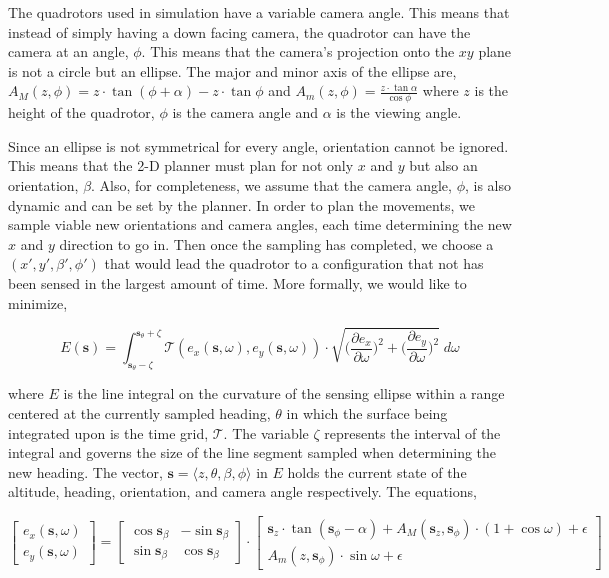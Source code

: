 \documentclass[12pt]{article}
\newcommand{\s}{\textbf{s}}
\begin{document}
The quadrotors used in simulation have a variable camera angle. This means that
instead of simply having a down facing camera, the quadrotor can have the
camera at an angle, $\phi$. This means that the camera's projection onto the
$xy$ plane is not a circle but an ellipse. The major and minor axis of the
ellipse are, $ A_M(z, \phi) = z \cdot \tan{(\phi + \alpha)} - z \cdot
\tan{\phi} $ and $ A_m(z, \phi) = \frac{z \cdot \tan{\alpha}}{\cos{\phi}} $
where $z$ is the height of the quadrotor, $\phi$ is the camera angle and
$\alpha$ is the viewing angle.

Since an ellipse is not symmetrical for every angle, orientation cannot be
ignored.  This means that the 2-D planner must plan for not only $x$ and $y$
but also an orientation, $\beta$. Also, for completeness, we assume that the
camera angle, $\phi$, is also dynamic and can be set by the planner. In order
to plan the movements, we sample viable new orientations and camera angles,
each time determining the new $x$ and $y$ direction to go in.  Then once the
sampling has completed, we choose a $(x', y',
\beta', \phi')$ that would lead the quadrotor to a configuration that not has
been sensed in the largest amount of time. More formally, we would like to
minimize,

$$ E(\s) = \int_{\s_{\theta} - \zeta}^{\s_{\theta} + \zeta}
\mathcal{T}(e_x(\s, \omega), e_y(\s, \omega)) \cdot \sqrt{ \Big(\frac{\partial
    e_x}{\partial \omega}\Big) ^ 2 + \Big(\frac{\partial e_y}{\partial
\omega}\Big) ^ 2} \;d\omega$$

where $E$ is the line integral on the curvature of the sensing ellipse within a
range centered at the currently sampled heading, $\theta$ in which the surface
being integrated upon is the time grid, $\mathcal{T}$. The variable $\zeta$
represents the interval of the integral and governs the size of the line
segment sampled when determining the new heading. The vector, $\s =
\langle z, \theta, \beta, \phi \rangle$ in $E$ holds the current state
of the altitude, heading, orientation, and camera angle respectively. The
equations,

$$
\begin{bmatrix}
    e_x(\s, \omega) \\[0.2em] e_y(\s, \omega)
\end{bmatrix} = \begin{bmatrix} \cos{\s_{\beta}} & -\sin{\s_{\beta}} \\[0.2em]
    \sin{\s_{\beta}}
& \cos{\s_{\beta}} \end{bmatrix}\cdot \begin{bmatrix} \s_z \cdot 
    \tan(\s_{\phi} - \alpha) +
    A_M(\s_z, \s_{\phi}) \cdot (1 + \cos{\omega}) + \epsilon \\[0.2em]
    A_m(z, \s_{\phi}) \cdot
\sin{\omega} + \epsilon \end{bmatrix} $$
\end{document}
